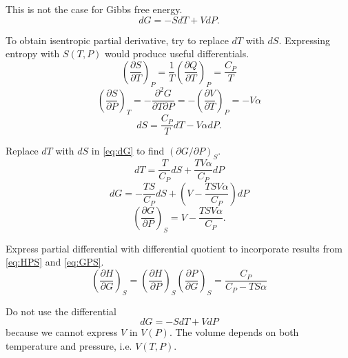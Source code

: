\begin{@empty}
\begin{answer}
    This is not the case for Gibbs free energy.
    \begin{equation}
        dG = -SdT + VdP. \label{eq:dG}
    \end{equation}

    To obtain isentropic partial derivative, try to replace $dT$ with $dS$.
    Expressing entropy with $S(T, P)$ would produce useful differentials.
    \[
        \left( \frac{\partial S}{\partial T} \right)_P
        = \frac1T \left( \frac{\partial Q}{\partial T} \right)_P
        = \frac{C_P}{T}
    \]
    \[
        \left( \frac{\partial S}{\partial P} \right)_T
        = -\frac{\partial^2 G}{\partial T \partial P}
        = -\left( \frac{\partial V}{\partial T} \right)_P
        = -V \alpha
    \]
    \[ dS = \frac{C_P}{T} dT - V \alpha dP. \]

    Replace $dT$ with $dS$ in \eqref{eq:dG} to find
    $\left( \partial G / \partial P \right)_S$.
    \[ dT = \frac{T}{C_P} dS + \frac{TV\alpha}{C_P} dP \]
    \[ dG = -\frac{TS}{C_P} dS + \left( V - \frac{TSV\alpha}{C_P} \right) dP \]
    \begin{equation}
        \left( \frac{\partial G}{\partial P} \right)_S = V - \frac{TSV\alpha}{C_P}. \label{eq:GPS}
    \end{equation}

    Express partial differential with differential quotient to incorporate
    results from \eqref{eq:HPS} and \eqref{eq:GPS}.
    \[
        \left( \frac{\partial H}{\partial G} \right)_S
        = \left( \frac{\partial H}{\partial P} \right)_S \left( \frac{\partial P}{\partial G} \right)_S
        = \frac{C_P}{C_P - TS\alpha}
    \]
\end{answer}

\begin{problem}
\end{problem}

\begin{problem}
\end{problem}

\begin{problem}
\end{problem}

\begin{problem}
\end{problem}

\begin{problem}
\end{problem}

\begin{remark}
    Do not use the differential
    \[ dG = -SdT + VdP \]
    because we cannot express $V$ in $V(P)$.  The volume depends on both
    temperature and pressure, i.e. $V(T, P)$.
\end{remark}


\end{@empty}
